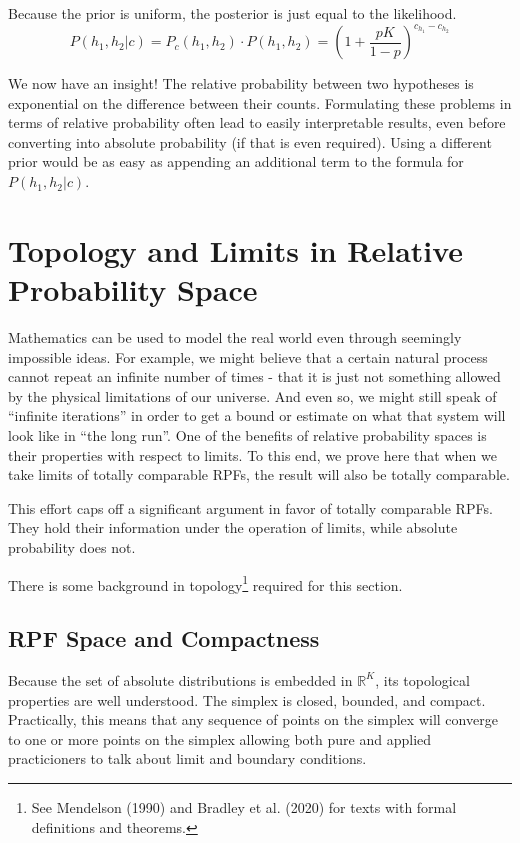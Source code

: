 \documentclass[twoside]{article}
\newcommand{\quotes}[1]{``#1''}
\theoremstyle{plain}%
\theoremstyle{definition}
\theoremstyle{remark}
\begin{document}
Because the prior is uniform, the posterior is just equal to the likelihood.
\[P(h_1, h_2 | c) = P_c(h_1, h_2) \cdot P(h_1, h_2) = \left(1 + \frac{pK}{1-p}\right)^{c_{h_1} - c_{h_2}} \]

We now have an insight! The relative probability between two hypotheses is exponential on the difference between their counts. Formulating these problems in terms of relative probability often lead to easily interpretable results, even before converting into absolute probability (if that is even required). Using a different prior would be as easy as appending an additional term to the formula for \(P(h_1, h_2|c)\).

\section{Topology and Limits in Relative Probability Space}
\label{section:topology}

Mathematics can be used to model the real world even through seemingly impossible ideas. For example, we might believe that a certain natural process cannot repeat an infinite number of times - that it is just not something allowed by the physical limitations of our universe. And even so, we might still speak of \quotes{infinite iterations} in order to get a bound or estimate on what that system will look like in \quotes{the long run}. One of the benefits of relative probability spaces is their properties with respect to limits. To this end, we prove here that when we take limits of totally comparable RPFs, the result will also be totally comparable.

This effort caps off a significant argument in favor of totally comparable RPFs. They hold their information under the operation of limits, while absolute probability does not.

There is some background in topology\footnote{See Mendelson (1990) \cite{mendelson} and Bradley et al. (2020) \cite{bradley} for texts with formal definitions and theorems.} required for this section.

\subsection{RPF Space and Compactness}

Because the set of absolute distributions is embedded in \(\mathbb{R}^K\), its topological properties are well understood. The simplex is closed, bounded, and compact. Practically, this means that any sequence of points on the simplex will converge to one or more points on the simplex allowing both pure and applied practicioners to talk about limit and boundary conditions.
\end{document}
